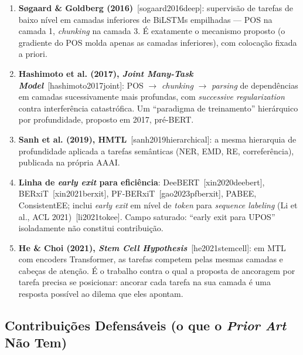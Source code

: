 \begin{enumerate}
  \item \textbf{Søgaard \& Goldberg (2016)}~[sogaard2016deep]: supervisão de tarefas de baixo
        nível em camadas inferiores de BiLSTMs empilhadas --- POS na camada 1,
        \textit{chunking} na camada 3. É exatamente o mecanismo proposto (o gradiente do POS
        molda apenas as camadas inferiores), com colocação fixada a priori.
  \item \textbf{Hashimoto et al. (2017), \textit{Joint Many-Task Model}}~[hashimoto2017joint]:
        POS $\rightarrow$ \textit{chunking} $\rightarrow$ \textit{parsing} de dependências em
        camadas sucessivamente mais profundas, com \textit{successive regularization} contra
        interferência catastrófica. Um ``paradigma de treinamento'' hierárquico por
        profundidade, proposto em 2017, pré-BERT.
  \item \textbf{Sanh et al. (2019), HMTL}~[sanh2019hierarchical]: a mesma hierarquia de
        profundidade aplicada a tarefas semânticas (NER, EMD, RE, correferência), publicada na
        própria AAAI.
  \item \textbf{Linha de \textit{early exit} para eficiência}: DeeBERT~[xin2020deebert],
        BERxiT~[xin2021berxit], PF-BERxiT~[gao2023pfberxit], PABEE, ConsistentEE; inclui
        \textit{early exit} em nível de \textit{token} para \textit{sequence labeling}
        (Li et al., ACL 2021)~[li2021tokee]. Campo saturado: ``early exit para UPOS''
        isoladamente não constitui contribuição.
  \item \textbf{He \& Choi (2021), \textit{Stem Cell Hypothesis}}~[he2021stemcell]: em MTL com
        encoders Transformer, as tarefas competem pelas mesmas camadas e cabeças de atenção.
        É o trabalho contra o qual a proposta de ancoragem por tarefa precisa se posicionar:
        ancorar cada tarefa na sua camada é uma resposta possível ao dilema que eles apontam.
\end{enumerate}

\subsection{Contribuições Defensáveis (o que o \textit{Prior Art} Não Tem)}
\label{subsec:proposta_contribuicoes}

